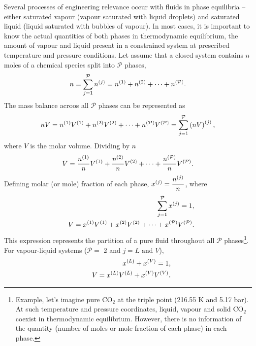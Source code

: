 Several processes of engineering relevance occur with fluids in phase equilibria -- either saturated vapour (\ie vapour saturated with liquid droplets) and saturated liquid (\ie liquid saturated with bubbles of vapour). In most cases, it is important to know the actual quantities of both phases in thermodynamic equilibrium, \ie the amount of vapour and liquid present in a constrained system at prescribed temperature and pressure conditions. Let assume that a closed system contains $n$ moles of a chemical species split into $\mathcal{P}$ phases,
    \begin{displaymath}
      n = \sum\limits_{j=1}^{\mathcal{P}} \mfr[n]{}{j} = \mfr[n]{}{1} + \mfr[n]{}{2} + \cdots + \mfr[n]{}{\mathcal{P}}.
    \end{displaymath}
The mass balance acroos all $\mathcal{P}$ phases can be represented as
    \begin{displaymath}
       nV = \mfr[n]{}{1}\mfr[V]{}{1} + \mfr[n]{}{2}\mfr[V]{}{2} + \cdots + \mfr[n]{}{\mathcal{P}}\mfr[V]{}{\mathcal{P}}  = \sum\limits_{j=1}^{\mathcal{P}}\left(nV\right)^{\left(j\right)},
    \end{displaymath}
where $V$ is the molar volume. Dividing by $n$
    \begin{displaymath}
       V = \frc{\mfr[n]{}{1}}{n}\mfr[V]{}{1} + \frc{\mfr[n]{}{2}}{n}\mfr[V]{}{2} + \cdots + \frc{\mfr[n]{}{\mathcal{P}}}{n}\mfr[V]{}{\mathcal{P}}.
    \end{displaymath}
Defining molar (or mole) fraction of each phase, $\mfr[x]{}{j}=\frc{\mfr[n]{}{j}}{n}$, where
    \begin{eqnarray}
         && \sum\limits_{j=1}^{\mathcal{P}}\mfr[x]{}{j} = 1,  \nonumber \\
         && V = \mfr[x]{}{1}\mfr[V]{}{1} + \mfr[x]{}{2}\mfr[V]{}{2} + \cdots + \mfr[x]{}{\mathcal{P}}\mfr[V]{}{\mathcal{P}}.  \nonumber
    \end{eqnarray}
This expression represents the partition of a pure fluid throughout all $\mathcal{P}$ phases\footnote{Example, let's imagine pure CO$_{2}$ at the triple point (216.55 K and 5.17 bar). At such temperature and pressure coordinates, liquid, vapour and solid CO$_{2}$ coexist in thermodynamic equilibrium. However, there is no information of the quantity (\ie number of moles or mole fraction of each phase) in each phase.}. For vapour-liquid systems (\ie $\mathcal{P=}$ 2 and $j = L\text{ and } V$),
    \begin{eqnarray}
         && \mfr[x]{}{L} + \mfr[x]{}{V} = 1,  \nonumber \\
         && V = \mfr[x]{}{L}\mfr[V]{}{L} + \mfr[x]{}{V}\mfr[V]{}{V}. \nonumber
    \end{eqnarray}
